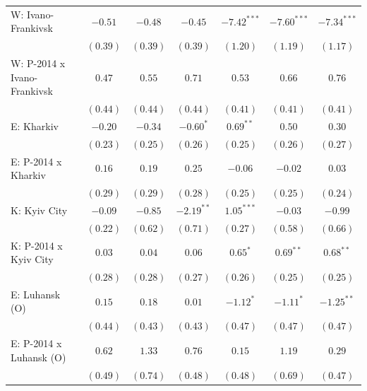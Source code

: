\begin{table}
\begin{center}
\begin{small}
\begin{tabular}{l c c c c c c}
W: Ivano-Frankivsk          & $-0.51$       & $-0.48$     & $-0.45$        & $-7.42^{***}$  & $-7.60^{***}$  & $-7.34^{***}$  \\
                            & $(0.39)$      & $(0.39)$    & $(0.39)$       & $(1.20)$       & $(1.19)$       & $(1.17)$       \\
W: P-2014 x Ivano-Frankivsk & $0.47$        & $0.55$      & $0.71$         & $0.53$         & $0.66$         & $0.76$         \\
                            & $(0.44)$      & $(0.44)$    & $(0.44)$       & $(0.41)$       & $(0.41)$       & $(0.41)$       \\
E: Kharkiv                  & $-0.20$       & $-0.34$     & $-0.60^{*}$    & $0.69^{**}$    & $0.50$         & $0.30$         \\
                            & $(0.23)$      & $(0.25)$    & $(0.26)$       & $(0.25)$       & $(0.26)$       & $(0.27)$       \\
E: P-2014 x Kharkiv         & $0.16$        & $0.19$      & $0.25$         & $-0.06$        & $-0.02$        & $0.03$         \\
                            & $(0.29)$      & $(0.29)$    & $(0.28)$       & $(0.25)$       & $(0.25)$       & $(0.24)$       \\
K: Kyiv City                & $-0.09$       & $-0.85$     & $-2.19^{**}$   & $1.05^{***}$   & $-0.03$        & $-0.99$        \\
                            & $(0.22)$      & $(0.62)$    & $(0.71)$       & $(0.27)$       & $(0.58)$       & $(0.66)$       \\
K: P-2014 x Kyiv City       & $0.03$        & $0.04$      & $0.06$         & $0.65^{*}$     & $0.69^{**}$    & $0.68^{**}$    \\
                            & $(0.28)$      & $(0.28)$    & $(0.27)$       & $(0.26)$       & $(0.25)$       & $(0.25)$       \\
E: Luhansk (O)              & $0.15$        & $0.18$      & $0.01$         & $-1.12^{*}$    & $-1.11^{*}$    & $-1.25^{**}$   \\
                            & $(0.44)$      & $(0.43)$    & $(0.43)$       & $(0.47)$       & $(0.47)$       & $(0.47)$       \\
E: P-2014 x Luhansk (O)     & $0.62$        & $1.33$      & $0.76$         & $0.15$         & $1.19$         & $0.29$         \\
                            & $(0.49)$      & $(0.74)$    & $(0.48)$       & $(0.48)$       & $(0.69)$       & $(0.47)$       \\

\end{tabular}
\end{small}
\end{center}
\end{table}
